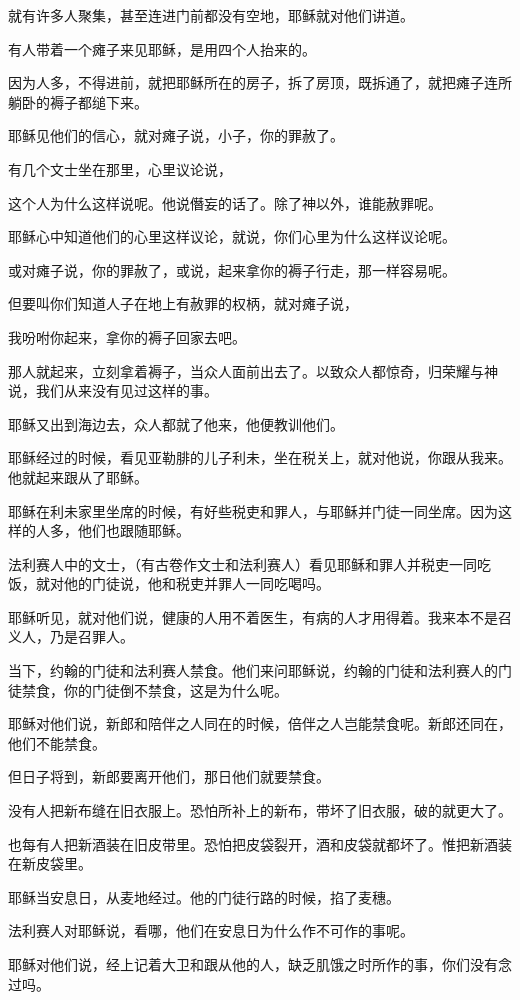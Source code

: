 \documentclass[12pt,oneside]{book}
\begin{document}
就有许多人聚集，甚至连进门前都没有空地，耶稣就对他们讲道。

有人带着一个瘫子来见耶稣，是用四个人抬来的。

因为人多，不得进前，就把耶稣所在的房子，拆了房顶，既拆通了，就把瘫子连所躺卧的褥子都缒下来。

耶稣见他们的信心，就对瘫子说，小子，你的罪赦了。

有几个文士坐在那里，心里议论说，

这个人为什么这样说呢。他说僭妄的话了。除了神以外，谁能赦罪呢。

耶稣心中知道他们的心里这样议论，就说，你们心里为什么这样议论呢。

或对瘫子说，你的罪赦了，或说，起来拿你的褥子行走，那一样容易呢。

但要叫你们知道人子在地上有赦罪的权柄，就对瘫子说，

我吩咐你起来，拿你的褥子回家去吧。

那人就起来，立刻拿着褥子，当众人面前出去了。以致众人都惊奇，归荣耀与神说，我们从来没有见过这样的事。

耶稣又出到海边去，众人都就了他来，他便教训他们。

耶稣经过的时候，看见亚勒腓的儿子利未，坐在税关上，就对他说，你跟从我来。他就起来跟从了耶稣。

耶稣在利未家里坐席的时候，有好些税吏和罪人，与耶稣并门徒一同坐席。因为这样的人多，他们也跟随耶稣。

法利赛人中的文士，（有古卷作文士和法利赛人）看见耶稣和罪人并税吏一同吃饭，就对他的门徒说，他和税吏并罪人一同吃喝吗。

耶稣听见，就对他们说，健康的人用不着医生，有病的人才用得着。我来本不是召义人，乃是召罪人。

当下，约翰的门徒和法利赛人禁食。他们来问耶稣说，约翰的门徒和法利赛人的门徒禁食，你的门徒倒不禁食，这是为什么呢。

耶稣对他们说，新郎和陪伴之人同在的时候，倍伴之人岂能禁食呢。新郎还同在，他们不能禁食。

但日子将到，新郎要离开他们，那日他们就要禁食。

没有人把新布缝在旧衣服上。恐怕所补上的新布，带坏了旧衣服，破的就更大了。

也每有人把新酒装在旧皮带里。恐怕把皮袋裂开，酒和皮袋就都坏了。惟把新酒装在新皮袋里。

耶稣当安息日，从麦地经过。他的门徒行路的时候，掐了麦穗。

法利赛人对耶稣说，看哪，他们在安息日为什么作不可作的事呢。

耶稣对他们说，经上记着大卫和跟从他的人，缺乏肌饿之时所作的事，你们没有念过吗。
\end{document}

